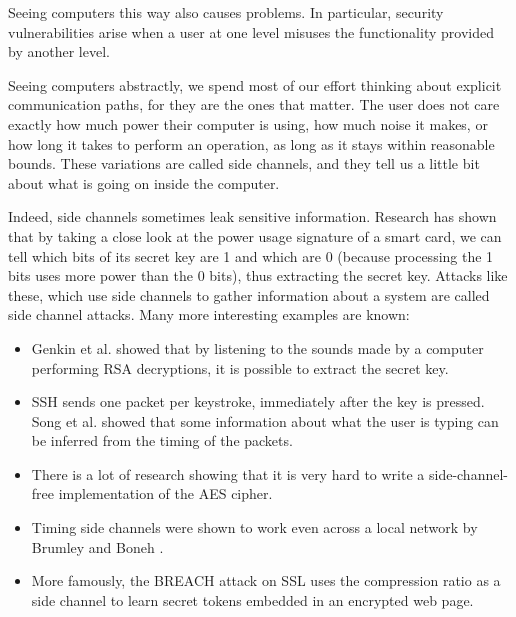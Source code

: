 \documentclass{acm_proc_article-sp}
\begin{document}
Seeing computers this way also causes problems. In particular, security
vulnerabilities arise when a user at one level misuses the functionality
provided by another level.

Seeing computers abstractly, we spend most of our effort thinking about explicit
communication paths, for they are the ones that matter. The user does not care
exactly how much power their computer is using, how much noise it makes, or how
long it takes to perform an operation, as long as it stays within reasonable
bounds. These variations are called side channels, and they tell us a little bit
about what is going on inside the computer.

Indeed, side channels sometimes leak sensitive information. Research
\cite{messerges1999power} has shown that by taking a close look at the power
usage signature of a smart card, we can tell which bits of its secret key are
1 and which are 0 (because processing the 1 bits uses more power than the
0 bits), thus extracting the secret key. Attacks like these, which use side
channels to gather information about a system are called side channel attacks.
Many more interesting examples are known:

\begin{itemize}
\item Genkin et al. \cite{genkin2013rsa} showed that by listening to the sounds
made by a computer performing RSA decryptions, it is possible to extract the
secret key.

\item SSH sends one packet per keystroke, immediately after the key is pressed.
Song et al. \cite{song2001timing} showed that some information about what the
user is typing can be inferred from the timing of the packets.

\item There is a lot of research \cite{bernstein2005cache, osvik2006cache,
weiss2012cache, aciiccmez2006cache} showing that it is very hard to write
a side-channel-free implementation of the AES cipher.

\item Timing side channels were shown to work even across a local network by
Brumley and Boneh \cite{brumley2005remote}.

\item More famously, the BREACH attack on SSL \cite{gluck2013breach} uses the
compression ratio as a side channel to learn secret tokens embedded in an
encrypted web page.

\end{itemize}
\end{document}
